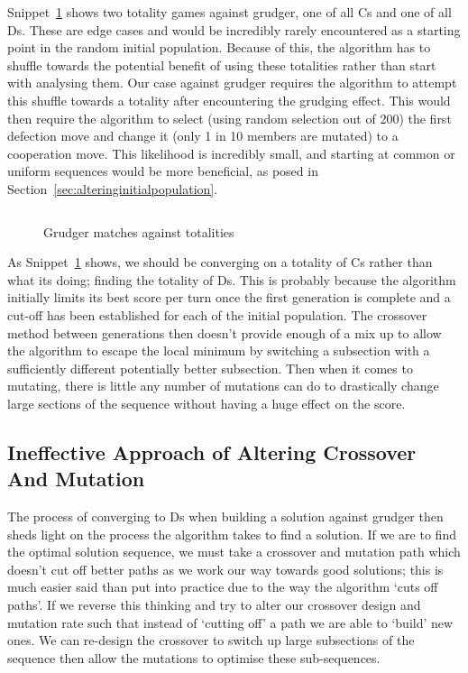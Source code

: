 Snippet~\ref{code:gudgerTotalities} shows two totality games against grudger, one of all Cs and one of all Ds.
These are edge cases and would be incredibly rarely encountered as a starting point in the random initial population.
Because of this, the algorithm has to shuffle towards the potential benefit of using these totalities rather than start with analysing them.
Our case against grudger requires the algorithm to attempt this shuffle towards a totality after encountering the grudging effect.
This would then require the algorithm to select (using random selection out of 200) the first defection move and change it (only 1 in 10 members are mutated) to a cooperation move.
This likelihood is incredibly small, and starting at common or uniform sequences would be more beneficial, as posed in Section~\ref{sec:alteringinitialpopulation}.

\begin{figure}
    \inputminted{python}{code_snippets/grudgerTotalities.py}
    \caption{Grudger matches against totalities}\label{code:gudgerTotalities}
\end{figure}

As Snippet~\ref{code:gudgerTotalities} shows, we should be converging on a totality of Cs rather than what its doing;
finding the totality of Ds.
This is probably because the algorithm initially limits its best score per turn once the first generation is complete and a cut-off has been established for each of the initial population.
The crossover method between generations then doesn't provide enough of a mix up to allow the algorithm to escape the local minimum by switching a subsection with a sufficiently different potentially better subsection.
Then when it comes to mutating, there is little any number of mutations can do to drastically change large sections of the sequence without having a huge effect on the score.

\subsection{Ineffective Approach of Altering Crossover And Mutation}\label{subsec:ineffectiveApproachOfAlteringCrossoverAndMutation}
The process of converging to Ds when building a solution against grudger then sheds light on the process the algorithm takes to find a solution.
If we are to find the optimal solution sequence, we must take a crossover and mutation path which doesn't cut off better paths as we work our way towards good solutions;
this is much easier said than put into practice due to the way the algorithm `cuts off paths'.
If we reverse this thinking and try to alter our crossover design and mutation rate such that instead of `cutting off' a path we are able to `build' new ones.
We can re-design the crossover to switch up large subsections of the sequence then allow the mutations to optimise these sub-sequences.

